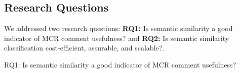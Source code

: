 \subsection{Research Questions}
We addressed two research questions: \textbf{RQ1:} Is semantic similarity a good indicator of MCR comment usefulness? and \textbf{RQ2:} Is semantic similarity classification cost-efficient, assurable, and scalable?.
%
%
%
%
%
%


\begin{ResearchQuestions}
\item[RQ1:] Is semantic similarity a good indicator of MCR comment usefulness?
\end{ResearchQuestions}

